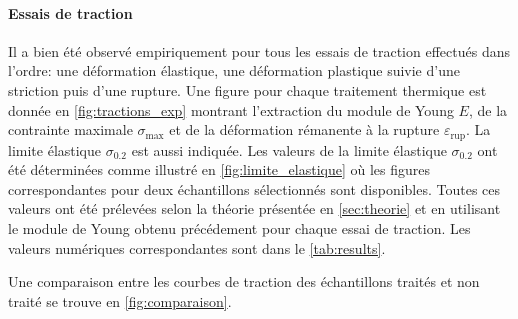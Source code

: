 \paragraph{Essais de traction}
Il a bien été observé empiriquement pour tous les essais de traction effectués dans l'ordre: une déformation élastique, une déformation plastique suivie d'une striction puis d'une rupture. Une figure pour chaque traitement thermique est donnée en \autoref{fig:tractions_exp} montrant l'extraction du module de Young $E$, de la contrainte maximale $\sigma_\mathrm{max}$ et de la déformation rémanente à la rupture $\varepsilon_{\textrm{rup}}$. La limite élastique $\sigma_{0.2}$ est aussi indiquée.
Les valeurs de la limite élastique $\sigma_{0.2}$ ont été déterminées comme illustré en \autoref{fig:limite_elastique} où les figures correspondantes pour deux échantillons sélectionnés sont disponibles. Toutes ces valeurs ont été prélevées selon la théorie présentée en \autoref{sec:theorie} et en utilisant le module de Young obtenu précédement pour chaque essai de traction. Les valeurs numériques correspondantes sont dans le \autoref{tab:results}.

Une comparaison entre les courbes de traction des échantillons traités et non traité se trouve en \autoref{fig:comparaison}.


